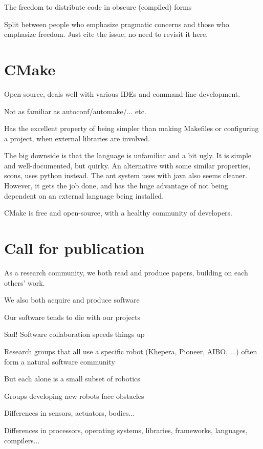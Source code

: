 The freedom to distribute code in obscure (compiled) forms



Split between people who emphasize pragmatic concerns and those
who emphasize freedom.  Just cite the issue, no need to revisit
it here.


\section{CMake}

Open-source, deals well with various IDEs and command-line development.

Not as familiar as autoconf/automake/... etc.

Has the excellent property of being simpler than making Makefiles
or configuring a project, when external libraries are involved.

The big downside is that the language is unfamiliar and a bit ugly.
It is simple and well-documented, but quirky.  An alternative with
some similar properties, scons, uses python instead.  The ant system
uses with java also seems cleaner.  However, it gets the job
done, and has the huge advantage of not being dependent on an
external language being installed.

CMake is free and open-source, with a healthy community of 
developers.



\section{Call for publication}

As a research community, we both read and produce papers, building on
each others' work.

We also both acquire and produce software

Our software tends to die with our projects

Sad!  Software collaboration speeds things up

Research groups that all use a specific robot (Khepera, Pioneer, AIBO,
...) often form a natural software community

But each alone is a small subset of robotics

Groups developing new robots face obstacles

Differences in sensors, actuators, bodies...

Differences in processors, operating systems, libraries, frameworks,
languages, compilers...

